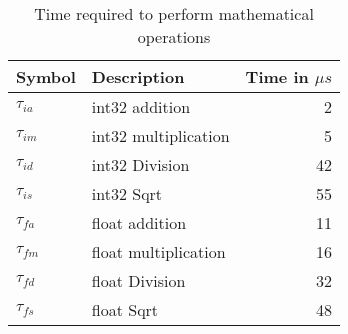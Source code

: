 \begin{table}[htb]
	\centering
	\caption{Time required to perform mathematical operations}
	\begin{tabular}{@{}llr@{}}
		Symbol & Description & Time in $\mu s$ \\
	\midrule
		$\tau_{ia}$  &  int32 addition  & 2 \\
		$\tau_{im}$  &  int32 multiplication  & 5 \\
		$\tau_{id}$  &  int32 Division  & 42 \\
		$\tau_{is}$  &  int32 Sqrt  & 55 \\
		$\tau_{fa}$  &  float addition  & 11 \\
		$\tau_{fm}$  &  float multiplication  & 16 \\
		$\tau_{fd}$  &  float Division  & 32 \\
		$\tau_{fs}$  &  float Sqrt  & 48 \\
	\bottomrule
	\end{tabular}
	\label{tab:ComputationTime}
\end{table}
